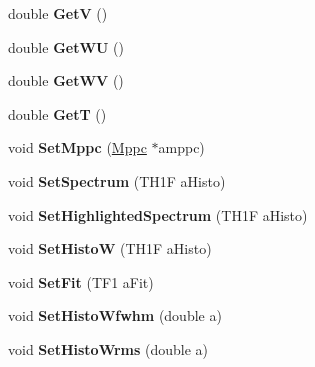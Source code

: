 \begin{DoxyCompactItemize}
\item 
\hypertarget{classCrystal_aab99e249407947b60dc54003f2b3323c}{double {\bfseries Get\+V} ()}\label{classCrystal_aab99e249407947b60dc54003f2b3323c}

\item 
\hypertarget{classCrystal_a983a0fcefdc19de4cc6de0b1c04c7f6c}{double {\bfseries Get\+W\+U} ()}\label{classCrystal_a983a0fcefdc19de4cc6de0b1c04c7f6c}

\item 
\hypertarget{classCrystal_a31b8c18bf9feb2a3cf785d3fa35d9b15}{double {\bfseries Get\+W\+V} ()}\label{classCrystal_a31b8c18bf9feb2a3cf785d3fa35d9b15}

\item 
\hypertarget{classCrystal_af73793ea59c22697866867896302d93e}{double {\bfseries Get\+T} ()}\label{classCrystal_af73793ea59c22697866867896302d93e}

\item 
\hypertarget{classCrystal_a8ad8c5364288e3f2abff5ad86ae3eca0}{void {\bfseries Set\+Mppc} (\hyperlink{classMppc}{Mppc} $\ast$amppc)}\label{classCrystal_a8ad8c5364288e3f2abff5ad86ae3eca0}

\item 
\hypertarget{classCrystal_a7ef968f68279b0010ad3abba2e5c5ed1}{void {\bfseries Set\+Spectrum} (T\+H1\+F a\+Histo)}\label{classCrystal_a7ef968f68279b0010ad3abba2e5c5ed1}

\item 
\hypertarget{classCrystal_ab746643d954d1eee7c0be0c0dd0ebd6f}{void {\bfseries Set\+Highlighted\+Spectrum} (T\+H1\+F a\+Histo)}\label{classCrystal_ab746643d954d1eee7c0be0c0dd0ebd6f}

\item 
\hypertarget{classCrystal_ad46ce2e741ee1a485780a3073a6365cf}{void {\bfseries Set\+Histo\+W} (T\+H1\+F a\+Histo)}\label{classCrystal_ad46ce2e741ee1a485780a3073a6365cf}

\item 
\hypertarget{classCrystal_aac912ce5dbdd63d795287db82572e993}{void {\bfseries Set\+Fit} (T\+F1 a\+Fit)}\label{classCrystal_aac912ce5dbdd63d795287db82572e993}

\item 
\hypertarget{classCrystal_aa612c1a9eae1a1f22d79a65d5e6c682d}{void {\bfseries Set\+Histo\+Wfwhm} (double a)}\label{classCrystal_aa612c1a9eae1a1f22d79a65d5e6c682d}

\item 
\hypertarget{classCrystal_a868d1e76014ffd4b09e545211d9c5035}{void {\bfseries Set\+Histo\+Wrms} (double a)}\label{classCrystal_a868d1e76014ffd4b09e545211d9c5035}


\end{DoxyCompactItemize}
